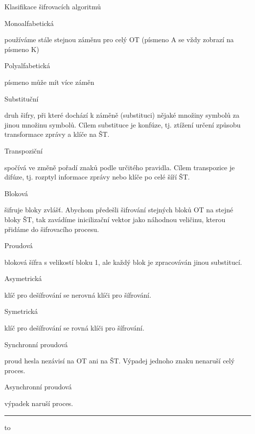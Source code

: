 
\chyph

\typosize[12/14]

\def\lc{\left\lfloor}   
\def\rc{\right\rfloor}

\chap Klasifikace šifrovacích algoritmů

\sec Monoalfabetická

používáme stále stejnou záměnu pro celý OT (písmeno A se vždy zobrazí na písmeno K)

\sec Polyalfabetická

písmeno může mít více záměn

\sec Substituční

druh šifry, při které dochází k záměně (substituci) nějaké množiny symbolů za jinou množinu symbolů. Cílem substituce je konfúze, tj. ztížení určení způsobu transformace zprávy a klíče na ŠT.

\sec Transpoziční

spočívá ve změně pořadí znaků podle určitého pravidla. Cílem transpozice je difúze, tj. rozptyl informace zprávy nebo klíče po celé šíří ŠT.

\sec Bloková

šifruje bloky zvlášť. Abychom předešli šifrování stejných bloků OT na stejné bloky ŠT, tak zavádíme inicilizační vektor jako náhodnou veličinu, kterou přidáme do šifrovacího procesu.

\sec Proudová

bloková šífra s velikostí bloku 1, ale každý blok je zpracováván jinou substitucí.

\sec Asymetrická

klíč pro dešífrování se nerovná klíči pro šífrování.

\sec Symetrická 

klíč pro dešífrování se rovná klíči pro šífrování.

\sec Synchronní proudová

proud hesla nezávisí na OT ani na ŠT. Výpadej jednoho znaku nenaruší celý proces. 

\sec Asynchronní proudová 

výpadek naruší proces.

\medskip\hrule\medskip

\hbox to 

